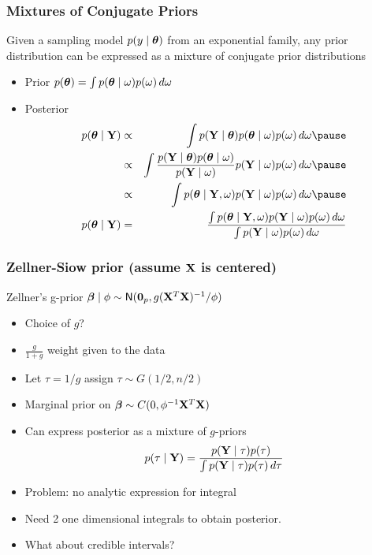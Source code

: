 \documentclass[]{beamer}\usepackage[]{graphicx}\usepackage[]{color}
\begin{document}
\begin{frame}
  \frametitle{Mixtures of Conjugate Priors}
  \begin{theorem}  Given a sampling model
  $p(y \mid \boldsymbol{\theta})$ from an exponential family, any prior distribution
  can be expressed as a mixture of conjugate prior distributions
 \end{theorem}

 \begin{itemize}
 \item Prior $p(\boldsymbol{\theta}) = \int p(\boldsymbol{\theta} \mid \omega) p(\omega)\, d \omega$ \pause
 \item Posterior \pause
   \begin{eqnarray*}
   p(\tb \mid \Y)  &\propto & \int p(\Y \mid \tb) p(\tb\mid \omega)
   p(\omega) \, d\omega \pause \\
 & \propto & \int  \frac{  p(\Y \mid \tb) p(\tb \mid \omega) } {p(\Y \mid
   \omega)}  p(\Y \mid
 \omega) p(\omega ) \, d \omega  \pause \\
& \propto & \int p(\tb \mid \Y, \omega)  p(\Y \mid
 \omega) p(\omega ) \, d \omega \pause \\
 p(\tb \mid \Y) & =  & \frac{\int p(\tb \mid \Y, \omega)  p(\Y \mid
 \omega) p(\omega ) \, d \omega }
{\int p(\Y \mid
 \omega) p(\omega ) \, d \omega }
       \end{eqnarray*}

 \end{itemize}
\end{frame}

\begin{frame}
  \frametitle{Zellner-Siow prior (assume $\mathbf{X}$ is centered)}
Zellner's g-prior $\boldsymbol{\beta} \mid \phi \sim \textsf{N}(\mathbf{0}_p, g
    (\mathbf{X}^T\mathbf{X})^{-1}/\phi)$ \pause

\begin{itemize}
\item Choice of $g$?  \pause
\item $\frac{g}{1 + g}$  weight given to the data \pause
\item Let $\tau = 1/g$ assign $\tau \sim G(1/2, n/2)$ \pause
\item Marginal prior on $\boldsymbol{\beta} \sim C(0, \phi^{-1} \mathbf{X}^T\mathbf{X})$
\item Can express posterior as a mixture of $g$-priors
$$p(\tau \mid \mathbf{Y}) = \frac{p(\mathbf{Y} \mid \tau) p(\tau)}{\int p(\mathbf{Y} \mid \tau) p(\tau) \, d \tau}$$ \pause
\item Problem:  no analytic expression for integral \pause
\item Need 2 one dimensional integrals to obtain posterior. \pause
\item What about credible intervals?
\end{itemize}
\end{frame}
\end{document}

